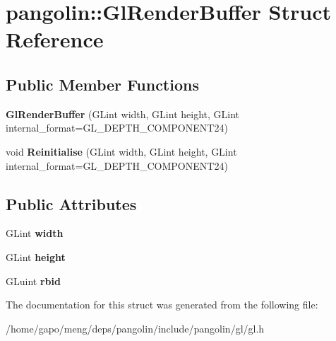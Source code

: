 \hypertarget{structpangolin_1_1_gl_render_buffer}{}\section{pangolin\+:\+:Gl\+Render\+Buffer Struct Reference}
\label{structpangolin_1_1_gl_render_buffer}
\subsection*{Public Member Functions}
\begin{DoxyCompactItemize}
\item 
{\bfseries Gl\+Render\+Buffer} (G\+Lint width, G\+Lint height, G\+Lint internal\+\_\+format=G\+L\+\_\+\+D\+E\+P\+T\+H\+\_\+\+C\+O\+M\+P\+O\+N\+E\+N\+T24)\hypertarget{structpangolin_1_1_gl_render_buffer_a699702a02b9107e57a8769abfe9ca908}{}\label{structpangolin_1_1_gl_render_buffer_a699702a02b9107e57a8769abfe9ca908}

\item 
void {\bfseries Reinitialise} (G\+Lint width, G\+Lint height, G\+Lint internal\+\_\+format=G\+L\+\_\+\+D\+E\+P\+T\+H\+\_\+\+C\+O\+M\+P\+O\+N\+E\+N\+T24)\hypertarget{structpangolin_1_1_gl_render_buffer_ab5b03d65e6de162267a8a23c0e133b61}{}\label{structpangolin_1_1_gl_render_buffer_ab5b03d65e6de162267a8a23c0e133b61}

\end{DoxyCompactItemize}
\subsection*{Public Attributes}
\begin{DoxyCompactItemize}
\item 
G\+Lint {\bfseries width}\hypertarget{structpangolin_1_1_gl_render_buffer_ac4fefa62277092f05c23914f0ceda6c3}{}\label{structpangolin_1_1_gl_render_buffer_ac4fefa62277092f05c23914f0ceda6c3}

\item 
G\+Lint {\bfseries height}\hypertarget{structpangolin_1_1_gl_render_buffer_afb09a9a82d85f1cad327699dd1c4d4e2}{}\label{structpangolin_1_1_gl_render_buffer_afb09a9a82d85f1cad327699dd1c4d4e2}

\item 
G\+Luint {\bfseries rbid}\hypertarget{structpangolin_1_1_gl_render_buffer_aac595e5112b644dfb8aed66476afea9d}{}\label{structpangolin_1_1_gl_render_buffer_aac595e5112b644dfb8aed66476afea9d}

\end{DoxyCompactItemize}


The documentation for this struct was generated from the following file\+:\begin{DoxyCompactItemize}
\item 
/home/gapo/meng/deps/pangolin/include/pangolin/gl/gl.\+h\end{DoxyCompactItemize}
